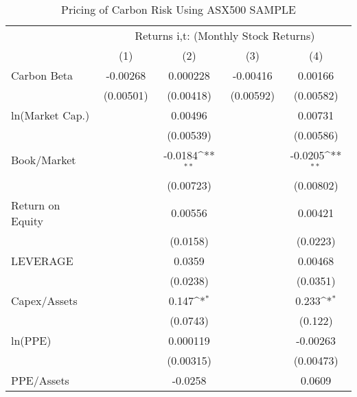 \begin{table}[htbp]\centering
\def\sym#1{\ifmmode^{#1}\else\(^{#1}\)\fi}
\caption{Pricing of Carbon Risk Using ASX500 SAMPLE}
\begin{tabular}{l*{4}{c}}
\hline\hline
                &\multicolumn{4}{c}{Returns i,t: (Monthly Stock Returns) }                  \\\cmidrule(lr){2-5}
                &\multicolumn{1}{c}{(1)}         &\multicolumn{1}{c}{(2)}         &\multicolumn{1}{c}{(3)}         &\multicolumn{1}{c}{(4)}         \\
\hline
Carbon Beta     & -0.00268         & 0.000228         & -0.00416         &  0.00166         \\
                &(0.00501)         &(0.00418)         &(0.00592)         &(0.00582)         \\
ln(Market Cap.) &                  &  0.00496         &                  &  0.00731         \\
                &                  &(0.00539)         &                  &(0.00586)         \\
Book/Market     &                  &  -0.0184\sym{**} &                  &  -0.0205\sym{**} \\
                &                  &(0.00723)         &                  &(0.00802)         \\
Return on Equity&                  &  0.00556         &                  &  0.00421         \\
                &                  & (0.0158)         &                  & (0.0223)         \\
LEVERAGE        &                  &   0.0359         &                  &  0.00468         \\
                &                  & (0.0238)         &                  & (0.0351)         \\
Capex/Assets    &                  &    0.147\sym{*}  &                  &    0.233\sym{*}  \\
                &                  & (0.0743)         &                  &  (0.122)         \\
ln(PPE)         &                  & 0.000119         &                  & -0.00263         \\
                &                  &(0.00315)         &                  &(0.00473)         \\
PPE/Assets      &                  &  -0.0258         &                  &   0.0609         \\

\end{tabular}
\end{table}
